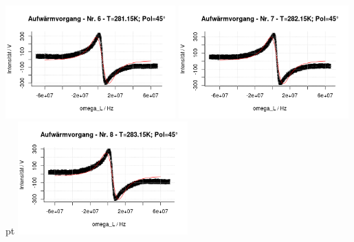 \documentclass[12pt]{article}
\begin{document}
\begin{minipage}[h!]{\textwidth}
	\includegraphics[width=0.49\textwidth]{figures/warm45-6.png}\vskip -10pt
	\includegraphics[width=0.49\textwidth]{figures/warm45-7.png} pt
	\includegraphics[width=0.49\textwidth]{figures/warm45-8.png}\vskip -10pt
\end{minipage}\newpage
\end{document}
